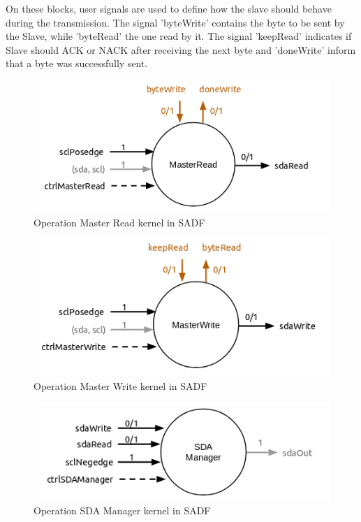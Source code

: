 \documentclass{article}
\begin{document}
On these blocks, user signals are used to define how the slave should behave during the transmission. The signal 'byteWrite' contains the byte to be sent by the Slave, while 'byteRead' the one read by it. The signal 'keepRead' indicates if Slave should ACK or NACK after receiving the next byte and 'doneWrite' inform that a byte was successfully sent.
\begin{figure}
  \includegraphics[width=\linewidth]{img/block_read.png}
  \caption{Operation Master Read kernel in SADF}
  \label{fig:block_read}
\end{figure}
\begin{figure}
  \includegraphics[width=\linewidth]{img/block_write.png}
  \caption{Operation Master Write kernel in SADF}
  \label{fig:block_write}
\end{figure}
\begin{figure}
  \includegraphics[width=\linewidth]{img/block_sda.png}
  \caption{Operation SDA Manager kernel in SADF}
  \label{fig:block_sda}
\end{figure}
\end{document}
